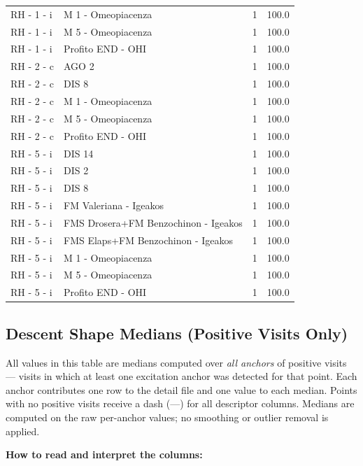 \documentclass[a4paper,11pt]{article}
\begin{document}
\begin{footnotesize}
\begin{longtable}{p{3.5cm}p{7.5cm}rr}
RH - 1 - i & M 1 - Omeopiacenza & 1 & 100.0 \\
RH - 1 - i & M 5 - Omeopiacenza & 1 & 100.0 \\
RH - 1 - i & Profito END - OHI & 1 & 100.0 \\
RH - 2 - c & AGO 2 & 1 & 100.0 \\
RH - 2 - c & DIS 8 & 1 & 100.0 \\
RH - 2 - c & M 1 - Omeopiacenza & 1 & 100.0 \\
RH - 2 - c & M 5 - Omeopiacenza & 1 & 100.0 \\
RH - 2 - c & Profito END - OHI & 1 & 100.0 \\
RH - 5 - i & DIS 14 & 1 & 100.0 \\
RH - 5 - i & DIS 2 & 1 & 100.0 \\
RH - 5 - i & DIS 8 & 1 & 100.0 \\
RH - 5 - i & FM Valeriana - Igeakos & 1 & 100.0 \\
RH - 5 - i & FMS Drosera+FM Benzochinon - Igeakos & 1 & 100.0 \\
RH - 5 - i & FMS Elaps+FM Benzochinon - Igeakos & 1 & 100.0 \\
RH - 5 - i & M 1 - Omeopiacenza & 1 & 100.0 \\
RH - 5 - i & M 5 - Omeopiacenza & 1 & 100.0 \\
RH - 5 - i & Profito END - OHI & 1 & 100.0 \\
\end{longtable}
\end{footnotesize}

\subsection{Descent Shape Medians (Positive Visits Only)}

All values in this table are medians computed over \emph{all anchors} of positive visits ---
visits in which at least one excitation anchor was detected for that point. Each anchor
contributes one row to the detail file and one value to each median. Points with no positive
visits receive a dash (---) for all descriptor columns.
Medians are computed on the raw per-anchor values; no smoothing or outlier removal is
applied.

\medskip
\noindent\textbf{How to read and interpret the columns:}
\end{document}

